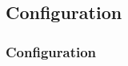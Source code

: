 \subsection{Configuration} \label{sec:Configuration}

\subsubsection{Configuration}
  \label{sec:Configuration}




\FloatBarrier
